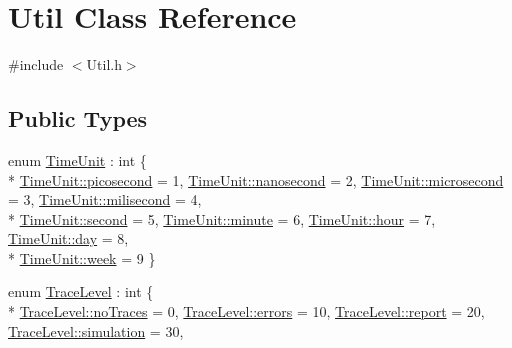 \hypertarget{class_util}{}\section{Util Class Reference}
\label{class_util}


{\ttfamily \#include $<$Util.\+h$>$}

\subsection*{Public Types}
\begin{DoxyCompactItemize}
\item 
enum \hyperlink{class_util_a28504cc2fecc9aa47154cba4e625ec6f}{Time\+Unit} \+: int \{ \\*
\hyperlink{class_util_a28504cc2fecc9aa47154cba4e625ec6fa50260728dd9e5aa12e649cbfc7d99e2d}{Time\+Unit\+::picosecond} = 1, 
\hyperlink{class_util_a28504cc2fecc9aa47154cba4e625ec6fa0d7938bf86d4dc7a82f872433a9e1a1c}{Time\+Unit\+::nanosecond} = 2, 
\hyperlink{class_util_a28504cc2fecc9aa47154cba4e625ec6faf4b6d59819445e05b152c708db4ede10}{Time\+Unit\+::microsecond} = 3, 
\hyperlink{class_util_a28504cc2fecc9aa47154cba4e625ec6fa40974a3007d9bde9588006a36d0c9ab5}{Time\+Unit\+::milisecond} = 4, 
\\*
\hyperlink{class_util_a28504cc2fecc9aa47154cba4e625ec6faa9f0e61a137d86aa9db53465e0801612}{Time\+Unit\+::second} = 5, 
\hyperlink{class_util_a28504cc2fecc9aa47154cba4e625ec6fa0a7d55be9d12a369a6a8da0fb517fba4}{Time\+Unit\+::minute} = 6, 
\hyperlink{class_util_a28504cc2fecc9aa47154cba4e625ec6fa896c55cc5e46fab38ce9f51ebf7bfcd3}{Time\+Unit\+::hour} = 7, 
\hyperlink{class_util_a28504cc2fecc9aa47154cba4e625ec6fa628b7db04235f228d40adc671413a8c8}{Time\+Unit\+::day} = 8, 
\\*
\hyperlink{class_util_a28504cc2fecc9aa47154cba4e625ec6fa172a8327fcd3685ab3c0f740d031da09}{Time\+Unit\+::week} = 9
 \}
\item 
enum \hyperlink{class_util_a0a3482cfa2d915e261c0cf528fdc7afc}{Trace\+Level} \+: int \{ \\*
\hyperlink{class_util_a0a3482cfa2d915e261c0cf528fdc7afca35fc71c3d52efde9c56df6874ac1258c}{Trace\+Level\+::no\+Traces} = 0, 
\hyperlink{class_util_a0a3482cfa2d915e261c0cf528fdc7afca07213a0161f52846ab198be103b5ab43}{Trace\+Level\+::errors} = 10, 
\hyperlink{class_util_a0a3482cfa2d915e261c0cf528fdc7afcae98d2f001da5678b39482efbdf5770dc}{Trace\+Level\+::report} = 20, 
\hyperlink{class_util_a0a3482cfa2d915e261c0cf528fdc7afca9e083ec666c9f3db044bb7c381640227}{Trace\+Level\+::simulation} = 30, 

\end{DoxyCompactItemize}

